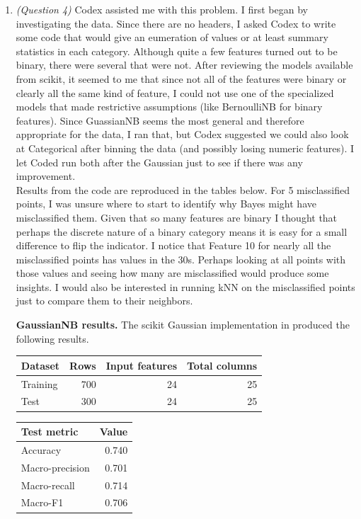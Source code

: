 \documentclass[12pt]{article}
\begin{document}
\begin{enumerate}
\item \emph{(Question 4)} Codex assisted me with this problem. I first began by investigating the data. Since there are no headers, I asked Codex to write some code that would give an eumeration of values or at least summary statistics in each category. 
Although quite a few features turned out to be binary, there were several that were not. After reviewing the models available from scikit, it seemed to me that since not all of the features were binary or clearly all the same kind of feature, I could not use one of the
specialized models that made restrictive assumptions (like BernoulliNB for binary features). Since GuassianNB seems the most general and therefore appropriate for the data, I ran that, but Codex suggested we could also look at Categorical after binning the data (and possibly losing numeric features). I let Coded run both after the Gaussian 
just to see if there was any improvement.\\

Results from the code are reproduced in the tables below. For 5 misclassified points, I was unsure where to start to identify why Bayes might have misclassified them. Given that so many features are binary I thought that perhaps the discrete nature of a binary category means it is easy for a small difference to flip the indicator.
I notice that Feature 10 for nearly all the misclassified points has values in the 30s. Perhaps looking at all points with those values and seeing how many are misclassified would produce some insights. I would also be interested in running kNN on the misclassified points just to compare them to their neighbors. 
\par\medskip
\noindent\begin{minipage}{\linewidth}
\textbf{GaussianNB results.}
The scikit Gaussian implementation in  produced the following results.

\begin{center}
\begin{tabular}{lrrr}
\hline
Dataset & Rows & Input features & Total columns \\
\hline
Training & 700 & 24 & 25 \\
Test & 300 & 24 & 25 \\
\hline
\end{tabular}
\end{center}

\begin{center}
\begin{tabular}{lr}
\hline
Test metric & Value \\
\hline
Accuracy & 0.740 \\
Macro-precision & 0.701 \\
Macro-recall & 0.714 \\
Macro-F1 & 0.706 \\
\hline
\end{tabular}
\end{center}


\end{minipage}
\end{enumerate}
\end{document}
